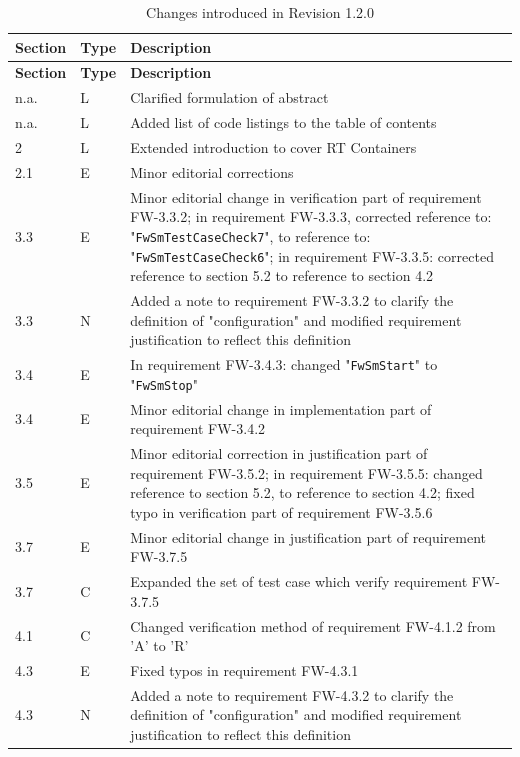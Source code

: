 \documentclass[a4paper,10pt]{article}
\begin{document}
\begin{longtable}{|p{1.5cm}|p{1cm}|p{8cm}|}
\caption{Changes introduced in Revision 1.2.0} \\
\hline
\rowcolor{light-gray}
\textbf{Section} & \textbf{Type} & \textbf{Description} \\
\hline\hline
\endfirsthead
\rowcolor{light-gray}
\textbf{Section} & \textbf{Type} & \textbf{Description} \\
\hline\hline
\endhead
n.a. & L & Clarified formulation of abstract\\
\hline
n.a. & L & Added list of code listings to the table of contents\\
\hline
2 & L & Extended introduction to cover RT Containers \\
\hline
2.1 & E & Minor editorial corrections\\
\hline
3.3 & E & Minor editorial change in verification part of requirement FW-3.3.2; in requirement FW-3.3.3, corrected reference to: "\texttt{FwSmTestCaseCheck7}", to reference to: "\texttt{FwSmTestCaseCheck6}"; in requirement FW-3.3.5: corrected reference to section 5.2 to reference to section 4.2\\
\hline
3.3 & N & Added a note to requirement FW-3.3.2 to clarify the definition of "configuration" and modified requirement justification to reflect this definition \\
\hline
3.4 & E & In requirement FW-3.4.3: changed "\texttt{FwSmStart}" to "\texttt{FwSmStop}"\\
\hline
3.4 & E & Minor editorial change in implementation part of requirement FW-3.4.2 \\
\hline
3.5 & E & Minor editorial correction in justification part of requirement FW-3.5.2; in requirement FW-3.5.5: changed reference to section 5.2, to reference to section 4.2; fixed typo in verification part of requirement FW-3.5.6 \\
\hline
3.7 & E & Minor editorial change in justification part of requirement FW-3.7.5 \\
\hline
3.7 & C & Expanded the set of test case which verify requirement FW-3.7.5 \\
\hline
4.1 & C & Changed verification method of requirement FW-4.1.2 from 'A' to 'R' \\
\hline
4.3 & E & Fixed typos in requirement FW-4.3.1 \\
\hline
4.3 & N & Added a note to requirement FW-4.3.2 to clarify the definition of "configuration" and modified requirement justification to reflect this definition \\

\end{longtable}
\end{document}
